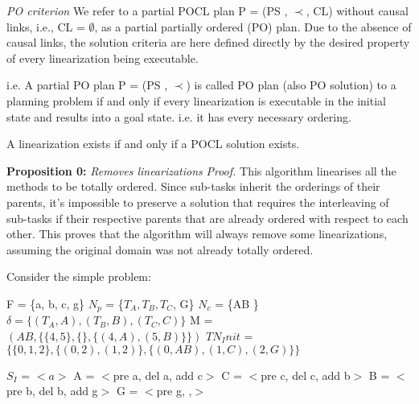 \emph{PO criterion} We refer to a partial POCL plan P = (PS , $\prec$, CL) without causal links, i.e., CL = $\emptyset$, as a partial partially ordered (PO) plan. Due to the absence of causal links, the solution criteria are here defined directly by the desired property of every linearization being executable.

i.e. A partial PO plan P = (PS , $\prec$) is called PO plan (also PO solution) to a planning problem if and only
if every linearization is executable in the initial state and results into a goal state.
i.e. it has every necessary ordering.

A linearization exists if and only if a POCL solution exists.


\textbf{Proposition 0:} \textit{Removes linearizations} \newline
\textit{Proof.}
This algorithm linearises all the methods to be totally ordered. Since sub-tasks inherit the orderings of their parents, it's impossible to preserve a solution that requires the interleaving of sub-tasks if their respective parents that are already ordered with respect to each other. This proves that the algorithm will always remove some linearizations, assuming the original domain was not already totally ordered.

Consider the simple problem:

F = \{a, b, c, g\}                                                           \newline
$N_p$ = \{$T_A, T_B, T_C$, G\}                                               \newline
$N_c$ = \{AB \}                                                               \newline
$\delta = \{ (T_A, A), (T_B, B), (T_C, C) \}$                                 \newline
M = $(AB,  \{ \{4,5\}, \{\}, \{(4,A), (5,B)\} \} )$                            \newline
$TN_Init$ = $\{ \{0,1,2\},  \{(0,2), (1,2)\}, \{(0,AB), (1,C), (2,G)\} \}$     \newline
	
	
$S_I$ = $<a>$	
	A = $<$pre a, del a, add c$>$          \newline
	C = $<$pre c, del c, add b$>$          \newline
	B = $<$pre b, del b, add g$>$          \newline
	G = $<$pre g, ,$>$                    \newline
	
